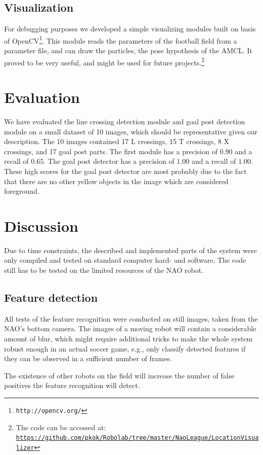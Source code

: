 \documentclass[	DIV=calc,%
							paper=a4,%
							fontsize=9pt,%
							twocolumn]{scrartcl}	 					%
\begin{document}
\subsection{Visualization}
For debugging purposes we developed a simple visualizing modules built on basis of OpenCV\footnote{\texttt{http://opencv.org/}}. This module reads the parameters of the football field from a parameter file, and can draw the particles, the pose hypothesis of the AMCL. It proved to be very useful, and might be used for future projects.\footnote{The code can be accessed at: \texttt{\url{https://github.com/pkok/Robolab/tree/master/NaoLeague/LocationVisualizer}}}

\section{Evaluation}
\label{sec:Evaluation}
We have evaluated the line crossing detection module and goal post detection module on a small dataset of 10 images, which should be representative given our description.  The 10 images contained 17 L crossings, 15 T crossings, 8 X crossings, and 17 goal post parts.  The first module has a precision of $0.90$ and a recall of $0.65$. The goal post detector has a precision of $1.00$ and a recall of $1.00$.  These high scores for the goal post detector are most probably due to the fact that there are no other yellow objects in the image which are considered foreground.
\section{Discussion}
\label{sec:Discussion}
Due to time constraints, the described and implemented parts of the system were only compiled and tested on standard computer hard- and software. The code still has to be tested on the limited resources of the NAO robot.

\subsection{Feature detection}
All tests of the feature recognition were conducted on still images, taken from the NAO's bottom camera. The images of a moving robot will contain a considerable amount of blur, which might require additional tricks to make the whole system robust enough in an actual soccer game, e.g., only classify detected features if they can be observed in a sufficient number of frames.

The existence of other robots on the field will increase the number of false positives the feature recognition will detect.
\end{document}
